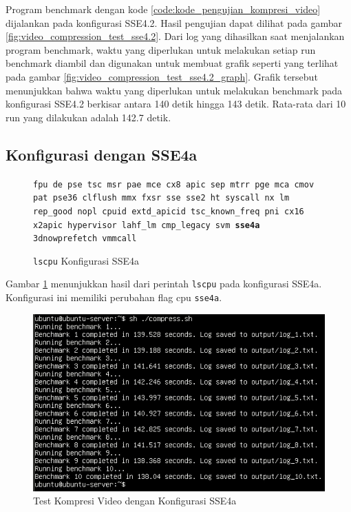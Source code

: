 Program benchmark dengan kode \ref{code:kode_pengujian_kompresi_video} dijalankan pada konfigurasi SSE4.2. Hasil pengujian dapat dilihat pada gambar \ref{fig:video_compression_test_sse4.2}. Dari log yang dihasilkan saat menjalankan program benchmark, waktu yang diperlukan untuk melakukan setiap run benchmark diambil dan digunakan untuk membuat grafik seperti yang terlihat pada gambar \ref{fig:video_compression_test_sse4.2_graph}. Grafik tersebut menunjukkan bahwa waktu yang diperlukan untuk melakukan benchmark pada konfigurasi SSE4.2 berkisar antara 140 detik hingga 143 detik. Rata-rata dari 10 run yang dilakukan adalah 142.7 detik.

\subsection{Konfigurasi dengan SSE4a}
\begin{figure}
    \texttt{fpu de pse tsc msr pae mce cx8 apic sep mtrr pge mca cmov pat pse36 clflush mmx fxsr sse sse2 ht syscall nx lm rep\_good nopl cpuid extd\_apicid tsc\_known\_freq pni cx16 x2apic hypervisor lahf\_lm cmp\_legacy svm \textbf{sse4a} 3dnowprefetch vmmcall}
    \caption{\texttt{lscpu} Konfigurasi SSE4a}
    \label{fig:lscpu_video_compression_test_sse4a}
\end{figure}

Gambar \ref{fig:lscpu_video_compression_test_sse4a} menunjukkan hasil dari perintah \texttt{lscpu} pada konfigurasi SSE4a. Konfigurasi ini memiliki perubahan flag cpu \texttt{sse4a}.

\begin{figure}
    \centering
    \includegraphics[width=1\textwidth]
    {assets/pics/video-compression-test/sse4a.jpeg}
    \caption{Test Kompresi Video dengan Konfigurasi SSE4a}
    \label{fig:video_compression_test_sse4a}
\end{figure}

